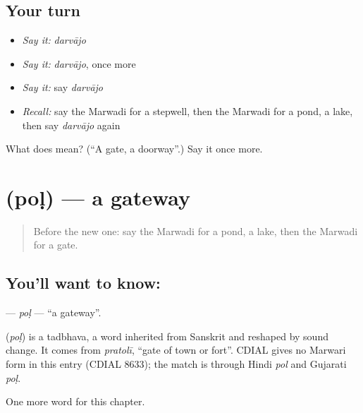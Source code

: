 \subsection*{Your turn}
\begin{itemize}
\raggedright
  \item \emph{Say it:} \emph{darvājo}
  \item \emph{Say it:} \emph{darvājo}, once more
  \item \emph{Say it:} say \emph{darvājo}
  \item \emph{Recall:} say the Marwadi for a stepwell, then the Marwadi for a pond, a lake, then say \emph{darvājo} again
\end{itemize}

\begin{tcolorbox}[breakable,colback=teal!4,colframe=teal!35!black,title={Before you move on}]
What does  mean? (\textquotedblleft{}A gate, a doorway\textquotedblright{}.) Say it once more.
\end{tcolorbox}
\section[\texorpdfstring{\mw{पोळ} (poḷ)}{पोळ (poḷ)}]{ (poḷ) — a gateway}

\label{lesson:MW-C100-pol}



\begin{quote}
Before the new one: say the Marwadi for a pond, a lake, then the Marwadi for a gate.
\end{quote}

\subsection*{You'll want to know: }
\textbf{} — \emph{poḷ} — \textquotedblleft{}a gateway\textquotedblright{}.

\begin{cousinweb}
\textbf{} (\emph{poḷ}) is a tadbhava, a word inherited from Sanskrit and reshaped by sound change. It comes from \emph{pratolī}, \textquotedblleft{}gate of town or fort\textquotedblright{}. CDIAL gives no Marwari form in this entry (CDIAL 8633); the match is through Hindi \emph{pol} and Gujarati \emph{poḷ}.
\end{cousinweb}

\begin{grammarlens}[title={What you've built}]
One more word for this chapter.
\end{grammarlens}

